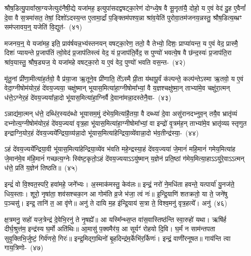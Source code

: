 श्रौष॒डित्यु॒पावा᳚स्रा॒ग्यजेत्युद॑नैषी॒द्ये यजा॑मह॒ इत्युपा॑स\-दद्वषट्का॒रेण॑ दोग्ध्ये॒ष वै सू॒नृता॑यै॒ दोहो॒ य ए॒वं वेद॑ दु॒ह ए॒वैनां᳚ दे॒वा वै स॒त्रमा॑सत॒ तेषां॒ दिशो॑\-ऽदस्य॒न्त ए॒तामा॒र्द्रां प॒ङ्क्तिम॑पश्य॒न्ना श्रा॑व॒येति॑ पुरोवा॒तम॑जनय॒न्नस्तु॒ श्रौष॒डित्य॒ब्भ्रꣳ सम॑प्लावय॒न्॒ यजेति॑ वि॒द्युत॑-~(४१)

मजनय॒न्॒ ये यजा॑मह॒ इति॒ प्राव॑र्\mbox{}षयन्न॒भ्य॑स्तनयन् वषट्का॒रेण॒ ततो॒ वै तेभ्यो॒ दिशः॒ प्राप्या॑यन्त॒ य ए॒वं वेद॒ प्रास्मै॒ दिशः॑ प्यायन्ते प्र॒जा\-प॑तिं त्वो॒वेद॑ प्र॒जा\-प॑तिस्त्वं वेद॒ यं प्र॒जा\-प॑ति॒र्वेद॒ स पुण्यो॑ भवत्ये॒ष वै छ॑न्द॒स्यः॑ प्र॒जा\-प॑ति॒रा श्रा॑व॒यास्तु॒ श्रौष॒ड्यज॒ ये यजा॑महे वषट्का॒रो य ए॒वं वेद॒ पुण्यो॑ भवति वस॒न्त-~(४२)

मृ॑तू॒नां प्री॑णा॒मीत्या॑ह॒र्तवो॒ वै प्र॑या॒जा ऋ॒तूने॒व प्री॑णाति॒ ते᳚\-ऽस्मै प्री॒ता य॑थापू॒र्वं क॑ल्पन्ते॒ कल्प॑न्ते\-ऽस्मा ऋ॒तवो॒ य ए॒वं वेदा॒ग्नी\-षोम॑योर॒हं दे॑वय॒ज्यया॒ चक्षु॑ष्मान् भूयास॒मित्या॑हा॒ग्नी\-षोमा᳚भ्यां॒ वै य॒ज्ञश्चक्षु॑ष्मा॒न् ताभ्या॑मे॒व चक्षु॑रा॒त्मन् ध॑त्ते॒\-ऽग्नेर॒हं दे॑वय॒ज्यया᳚न्ना॒दो भू॑यास॒मित्या॑हा॒ग्निर्वै दे॒वाना॑मन्ना॒दस्तेनै॒वा-~(४३)

ऽन्नाद्य॑मा॒त्मन् ध॑त्ते॒ दब्धि॑र॒स्यद॑ब्धो भूयासम॒मुं द॑भेय॒मित्या॑\-है॒तया॒ वै दब्ध्या॑ दे॒वा असु॑रानदभ्नुव॒न् तयै॒व भ्रातृ॑व्यं दभ्नोत्य॒ग्नी\-षोम॑यो\-र॒हं दे॑वय॒ज्यया॑ वृत्र॒हा भू॑यास॒मित्या॑हा॒ग्नी\-षोमा᳚भ्यां॒ वा इन्द्रो॑ वृ॒त्रम॑ह॒न् ताभ्या॑मे॒व भ्रातृ॑व्यꣴ स्तृणुत इन्द्राग्नि॒योर॒हं दे॑व\-य॒ज्यये᳚\-न्द्रिया॒व्य॑न्ना॒दो भू॑यास॒मित्या॑हेन्द्रिया॒व्ये॑वान्ना॒दो भ॑व॒तीन्द्र॑स्या॒-~(४४)

ऽहं दे॑वय॒ज्यये᳚न्द्रिया॒वी भू॑यास॒मित्या॑हेन्द्रिया॒व्ये॑व भ॑वति महे॒न्द्रस्या॒हं दे॑वय॒ज्यया॑ जे॒मानं॑ महि॒मानं॑ गमेय॒मित्या॑ह जे॒मान॑मे॒व म॑हि॒मानं॑ गच्छत्य॒ग्नेः स्वि॑ष्ट॒कृतो॒\-ऽहं दे॑वय॒ज्यया\-ऽऽ\-यु॑ष्मान् य॒ज्ञेन॑ प्रति॒ष्ठां ग॑मेय॒मित्या॒हा\-ऽऽ\-यु॑रे॒वा\-ऽऽ\-त्मन् ध॑त्ते॒ प्रति॑ य॒ज्ञेन॑ तिष्ठति॥~(४५)

{\anuvakamend[{प्र॒ति॒ष्ठाम॑ह्व॒दस्तु॑ वि॒द्युतं॑ वस॒न्तमे॒वेन्द्र॑स्या॒\-ऽष्टात्रिꣳ॑शच्च}]}%

इन्द्रं॑ वो वि॒श्वत॒स्परि॒ हवा॑महे॒ जने᳚भ्यः। अ॒स्माक॑मस्तु॒ केव॑लः॥ इन्द्रं॒ नरो॑ ने॒मधि॑ता हवन्ते॒ यत्पार्या॑ यु॒नज॑ते॒ धिय॒स्ताः। शूरो॒ नृषा॑ता॒ शव॑सश्चका॒न आ गोम॑ति व्र॒जे भ॑जा॒ त्वं नः॑॥ इ॒न्द्रि॒याणि॑ शतक्रतो॒ या ते॒ जने॑षु प॒ञ्चसु॑। इन्द्र॒ तानि॑ त॒ आ वृ॑णे॥ अनु॑ ते दायि म॒ह इ॑न्द्रि॒याय॑ स॒त्रा ते॒ विश्व॒मनु॑ वृत्र॒हत्ये᳚। अनु॑~(४६)

क्ष॒त्रमनु॒ सहो॑ यज॒त्रेन्द्र॑ दे॒वेभि॒रनु॑ ते नृ॒षह्ये᳚॥ आ यस्मि᳚न्थ्स॒प्त वा॑स॒वास्तिष्ठ॑न्ति स्वा॒रुहो॑ यथा। ऋषि॑र्\mbox{}ह दीर्घ॒श्रुत्त॑म॒ इन्द्र॑स्य घ॒र्मो अति॑थिः॥ आ॒मासु॑ प॒क्वमैर॑य॒ आ सूर्यꣳ॑ रोहयो दि॒वि। घ॒र्मं न साम॑न्तपता सुवृ॒क्तिभि॒र्जुष्टं॒ गिर्व॑णसे॒ गिरः॑॥ इन्द्र॒मिद्गा॒थिनो॑ बृ॒हदिन्द्र॑म॒र्केभि॑र॒र्किणः॑। इन्द्रं॒ वाणी॑रनूषत॥ गाय॑न्ति त्वा \mbox{गाय॒त्रिणो-~(४७)}

